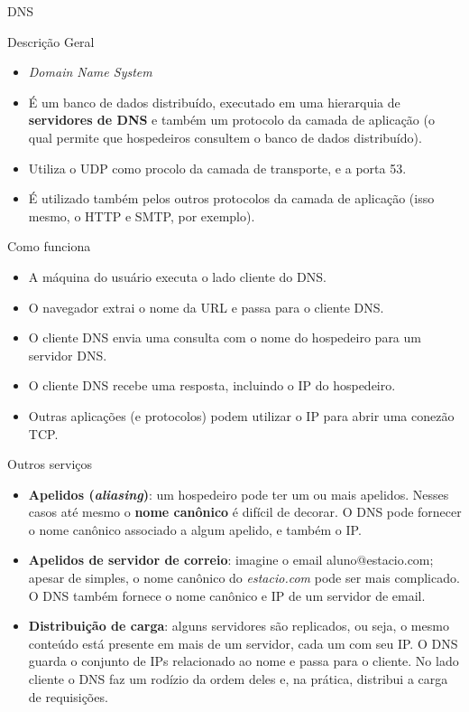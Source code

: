 \documentclass{libs/ufc_format}
\begin{document}
\begin{frame}{}
    \centering
    \Large
    DNS
\end{frame}

\begin{frame}{Descrição Geral}
    \begin{itemize}
        \justifying
        \item \textit{Domain Name System}
        \item É um banco de dados distribuído, executado em uma hierarquia de \textbf{servidores de DNS} e também um protocolo da camada de aplicação (o qual permite que hospedeiros consultem o banco de dados distribuído).
        \item Utiliza o UDP como procolo da camada de transporte, e a porta 53.
        \item É utilizado também pelos outros protocolos da camada de aplicação (isso mesmo, o HTTP e SMTP, por exemplo).
    \end{itemize}
\end{frame}

\begin{frame}{Como funciona}
    \begin{itemize}
        \justifying
        \item A máquina do usuário executa o lado cliente do DNS.
        \item O navegador extrai o nome da URL e passa para o cliente DNS.
        \item O cliente DNS envia uma consulta com o nome do hospedeiro para um servidor DNS.
        \item O cliente DNS recebe uma resposta, incluindo o IP do hospedeiro.
        \item Outras aplicações (e protocolos) podem utilizar o IP para abrir uma conezão TCP.
    \end{itemize}
\end{frame}

\begin{frame}{Outros serviços}
    \begin{itemize}
        \justifying
        \item<1> \textbf{Apelidos (\textit{aliasing})}: um hospedeiro pode ter um ou mais apelidos. Nesses casos até mesmo o \textbf{nome canônico} é difícil de decorar. O DNS pode fornecer o nome canônico associado a algum apelido, e também o IP.
        \item<2> \textbf{Apelidos de servidor de correio}: imagine o email aluno@estacio.com; apesar de simples, o nome canônico do \textit{estacio.com} pode ser mais complicado. O DNS também fornece o nome canônico e IP de um servidor de email.
        \item<3> \textbf{Distribuição de carga}: alguns servidores são replicados, ou seja, o mesmo conteúdo está presente em mais de um servidor, cada um com seu IP. O DNS guarda o conjunto de IPs relacionado ao nome e passa para o cliente. No lado cliente o DNS faz um rodízio da ordem deles e, na prática, distribui a carga de requisições.
    \end{itemize}
\end{frame}
\end{document}
